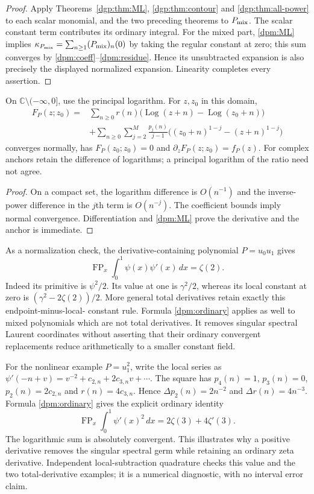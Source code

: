 \begin{proof}
Apply Theorems~\ref{dgp:thm:ML}, \ref{dgp:thm:contour} and
\ref{dgp:thm:all-power} to each scalar monomial, and the two preceding
theorems to $P_{\rm mix}$.  The scalar constant term contributes its
ordinary integral.  For the mixed part, \eqref{dpm:ML} implies
$\kappa_{P_{\rm mix}}=\sum_{n\ge1}(P_{\rm mix})_n(0)$ by taking the regular constant at zero;
this sum converges by \eqref{dpm:coeff}--\eqref{dpm:residue}.
Hence its unsubtracted expansion is also precisely the displayed
normalized expansion.  Linearity completes every assertion.
\end{proof}

\begin{corollary}
\label{dpm:primitive}
On $\mathbb C\setminus(-\infty,0]$, use the principal logarithm.
For $z,z_0$ in this domain,
\begin{align*}
 F_P(z;z_0)={}&\sum_{n\ge0}r(n)
       \bigl(\operatorname{Log}(z+n)-\operatorname{Log}(z_0+n)\bigr)\\
 &+\sum_{n\ge0}\sum_{j=2}^M\frac{p_j(n)}{j-1}
       \bigl((z_0+n)^{1-j}-(z+n)^{1-j}\bigr)
\end{align*}
converges normally, has $F_P(z_0;z_0)=0$ and
$\partial_zF_P(z;z_0)=f_P(z)$.  For complex anchors retain the difference
of logarithms; a principal logarithm of the ratio need not agree.
\end{corollary}

\begin{proof}
On a compact set, the logarithm difference is $O(n^{-1})$ and the
inverse-power difference in the $j$th term is $O(n^{-j})$.
The coefficient bounds imply normal convergence.  Differentiation
and \eqref{dpm:ML} prove the derivative and the anchor is immediate.
\end{proof}

As a normalization check, the derivative-containing polynomial
$P=u_0u_1$ gives
\[
 \operatorname{FP}_x\int_0^1\psi(x)\psi'(x)\,dx=\zeta(2).
\]
Indeed its primitive is $\psi^2/2$.  Its value at one is $\gamma^2/2$,
whereas its local constant at zero is $(\gamma^2-2\zeta(2))/2$.
More general total derivatives retain exactly this endpoint-minus-local-
constant rule.  Formula \eqref{dpm:ordinary} applies as well to mixed
polynomials which are not total derivatives.  It removes singular
spectral Laurent coordinates without asserting that their ordinary
convergent replacements reduce arithmetically to a smaller constant field.

For the nonlinear example $P=u_1^2$, write the local series as
$\psi'(-n+v)=v^{-2}+c_{2,n}+2c_{3,n}v+\cdots$.
The square has $p_4(n)=1$, $p_3(n)=0$, $p_2(n)=2c_{2,n}$ and
$r(n)=4c_{3,n}$.  Hence $\Delta p_2(n)=2n^{-2}$ and
$\Delta r(n)=4n^{-3}$.  Formula \eqref{dpm:ordinary} gives the
explicit ordinary identity
\[
 \operatorname{FP}_x\int_0^1\psi'(x)^2\,dx
       =2\zeta(3)+4\zeta'(3).
\]
The logarithmic sum is absolutely convergent.  This illustrates why a
positive derivative removes the singular spectral germ while retaining
an ordinary zeta derivative.  Independent local-subtraction quadrature
checks this value and the two total-derivative examples; it is a numerical
diagnostic, with no interval error claim.
